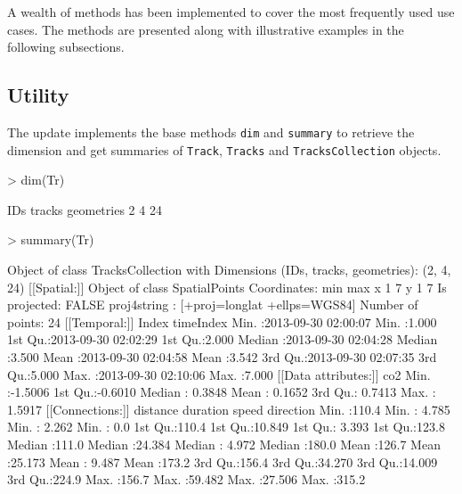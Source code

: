 \documentclass{article}
\newcommand{\code}[1]{{\tt #1}}
\begin{document}
A wealth of methods has been implemented to cover the most frequently used use cases. The methods are presented along with illustrative examples in the following subsections.

\subsection{Utility}

The update implements the base methods \code{dim} and \code{summary} to retrieve the dimension and get summaries of \code{Track}, \code{Tracks} and \code{TracksCollection} objects.

\begin{Schunk}
\begin{Sinput}
> dim(Tr)
\end{Sinput}
\begin{Soutput}
       IDs     tracks geometries 
         2          4         24 
\end{Soutput}
\begin{Sinput}
> summary(Tr)
\end{Sinput}
\begin{Soutput}
Object of class TracksCollection
 with Dimensions (IDs, tracks, geometries): (2, 4, 24)
[[Spatial:]]
Object of class SpatialPoints
Coordinates:
  min max
x   1   7
y   1   7
Is projected: FALSE 
proj4string : [+proj=longlat +ellps=WGS84]
Number of points: 24
[[Temporal:]]
     Index                       timeIndex    
 Min.   :2013-09-30 02:00:07   Min.   :1.000  
 1st Qu.:2013-09-30 02:02:29   1st Qu.:2.000  
 Median :2013-09-30 02:04:28   Median :3.500  
 Mean   :2013-09-30 02:04:58   Mean   :3.542  
 3rd Qu.:2013-09-30 02:07:35   3rd Qu.:5.000  
 Max.   :2013-09-30 02:10:06   Max.   :7.000  
[[Data attributes:]]
      co2         
 Min.   :-1.5006  
 1st Qu.:-0.6010  
 Median : 0.3848  
 Mean   : 0.1652  
 3rd Qu.: 0.7413  
 Max.   : 1.5917  
[[Connections:]]
    distance        duration          speed          direction    
 Min.   :110.4   Min.   : 4.785   Min.   : 2.262   Min.   :  0.0  
 1st Qu.:110.4   1st Qu.:10.849   1st Qu.: 3.393   1st Qu.:123.8  
 Median :111.0   Median :24.384   Median : 4.972   Median :180.0  
 Mean   :126.7   Mean   :25.173   Mean   : 9.487   Mean   :173.2  
 3rd Qu.:156.4   3rd Qu.:34.270   3rd Qu.:14.009   3rd Qu.:224.9  
 Max.   :156.7   Max.   :59.482   Max.   :27.506   Max.   :315.2  
\end{Soutput}
\end{Schunk}
\end{document}
